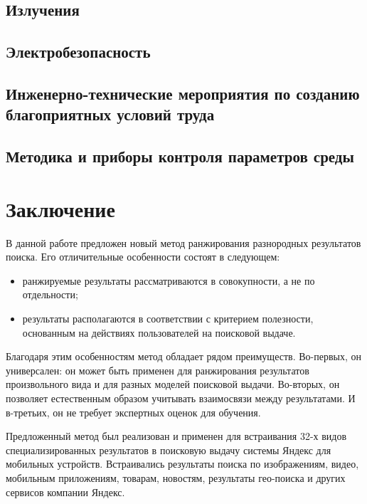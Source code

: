 \documentclass[12pt,a4paper]{report}
\begin{document}
\section{Излучения}
\section{Электробезопасность}
\section{Инженерно-технические мероприятия по созданию благоприятных условий труда}
\section{Методика и приборы контроля параметров среды}


\chapter*{Заключение}

В данной работе предложен новый метод ранжирования разнородных результатов поиска. Его отличительные особенности состоят в следующем:
\begin{itemize}
  \item ранжируемые результаты рассматриваются в совокупности, а не по отдельности;
  \item результаты располагаются в соответствии с критерием полезности, основанным на действиях пользователей на поисковой выдаче. %
\end{itemize}
Благодаря этим особенностям метод обладает рядом преимуществ. Во-первых, он универсален: он может быть применен для ранжирования результатов произвольного вида и для разных моделей поисковой выдачи. Во-вторых, он позволяет естественным образом учитывать взаимосвязи между результатами. И в-третьих, он не требует экспертных оценок для обучения. 


Предложенный метод был реализован и применен для встраивания 32-х видов специализированных результатов в поисковую выдачу системы Яндекс для мобильных устройств. Встраивались результаты поиска по изображениям, видео, мобильным приложениям, товарам, новостям, результаты гео-поиска и других сервисов компании Яндекс. 
\end{document}
